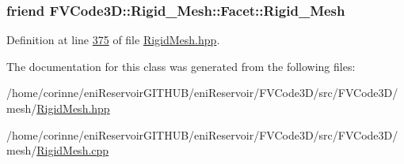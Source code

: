 \subsubsection[{\texorpdfstring{Rigid\+\_\+\+Mesh}{Rigid_Mesh}}]{\setlength{\rightskip}{0pt plus 5cm}friend F\+V\+Code3\+D\+::\+Rigid\+\_\+\+Mesh\+::\+Facet\+::\+Rigid\+\_\+\+Mesh}\hypertarget{classFVCode3D_1_1Rigid__Mesh_1_1Facet_a90c299b74b71dab33ec4057a7a59817f}{}\label{classFVCode3D_1_1Rigid__Mesh_1_1Facet_a90c299b74b71dab33ec4057a7a59817f}


Definition at line \hyperlink{RigidMesh_8hpp_source_l00375}{375} of file \hyperlink{RigidMesh_8hpp_source}{Rigid\+Mesh.\+hpp}.



The documentation for this class was generated from the following files\+:\begin{DoxyCompactItemize}
\item 
/home/corinne/eni\+Reservoir\+G\+I\+T\+H\+U\+B/eni\+Reservoir/\+F\+V\+Code3\+D/src/\+F\+V\+Code3\+D/mesh/\hyperlink{RigidMesh_8hpp}{Rigid\+Mesh.\+hpp}\item 
/home/corinne/eni\+Reservoir\+G\+I\+T\+H\+U\+B/eni\+Reservoir/\+F\+V\+Code3\+D/src/\+F\+V\+Code3\+D/mesh/\hyperlink{RigidMesh_8cpp}{Rigid\+Mesh.\+cpp}\end{DoxyCompactItemize}
